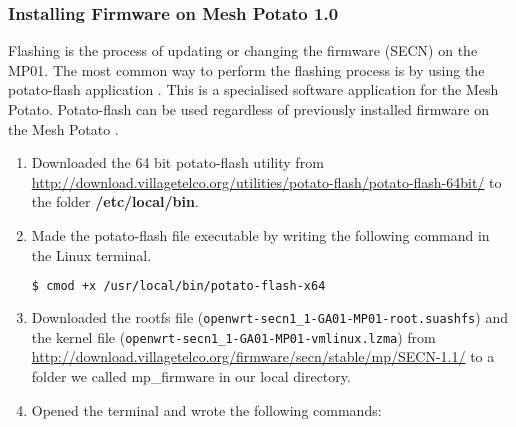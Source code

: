 \subsubsection{Installing Firmware on Mesh Potato 1.0}
Flashing is the process of updating or changing the firmware (SECN) on the MP01. The most common way to perform the flashing process is by using the potato-flash application \cite{flashing}. This is a specialised software application for the Mesh Potato. Potato-flash can be used regardless of previously installed firmware on the Mesh Potato \cite{InstallingSecnFirmware}. 

\begin{enumerate}
\item Downloaded the 64 bit potato-flash utility from \url{http://download.villagetelco.org/utilities/potato-flash/potato-flash-64bit/} to the folder \textbf{/etc/local/bin}.
\item Made the potato-flash file executable by writing the following command in the Linux terminal.
\begin{lstlisting}[language=bash]
  $ cmod +x /usr/local/bin/potato-flash-x64
\end{lstlisting}
\item Downloaded the rootfs file (\texttt{openwrt-secn1_1-GA01-MP01-root.suashfs}) and the kernel file (\texttt{openwrt-secn1_1-GA01-MP01-vmlinux.lzma})  from \url{http://download.villagetelco.org/firmware/secn/stable/mp/SECN-1.1/} to a folder we called mp\_firmware in our local directory.
\item Opened the terminal and wrote the following commands: 
\end{enumerate}


